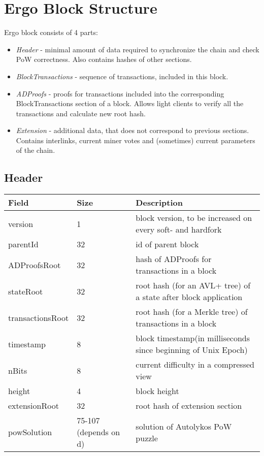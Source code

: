 \section{Ergo Block Structure}
Ergo block consists of 4 parts:

\begin{itemize}
    \item{\em Header } - minimal amount of data required to synchronize the chain and check PoW correctness.
    Also contains hashes of other sections.
    \item{\em BlockTransactions } - sequence of transactions, included in this block.
    \item{\em ADProofs } - proofs for transactions included into the corresponding BlockTransactions section of a block.
    Allows light clients to verify all the transactions and calculate new root hash.
    \item{\em Extension } - additional data, that does not correspond to previous sections.
    Contains interlinks, current miner votes and (sometimes) current parameters of the chain.
\end{itemize}

\subsection{Header}
\vspace{1em}
\begin{tabular}{ |p{2.5cm}||p{0.5cm}|p{7.5cm}|  }
    \hline
    \hline
    Field & Size & Description  \\
    \hline
    version  &  1 &  block version, to be increased on every soft- and hardfork  \\
    \hline
    parentId &  32 &  id of parent block  \\
    \hline
    ADProofsRoot &  32 &  hash of ADProofs for transactions in a block \\
    \hline
    stateRoot &  32 &  root hash (for an AVL+ tree) of a state after block application  \\
    \hline
    transactionsRoot  &  32 &  root hash (for a Merkle tree) of transactions in a block  \\
    \hline
    timestamp &  8 &  block timestamp(in milliseconds since beginning of Unix Epoch)  \\
    \hline
    nBits &  8 & current difficulty in a compressed view  \\
    \hline
    height &  4 & block height  \\
    \hline
    extensionRoot & 32 & root hash of extension section  \\
    \hline
    powSolution & 75-107 (depends on d) & solution of Autolykos PoW puzzle  \\
    \hline
\end{tabular}

